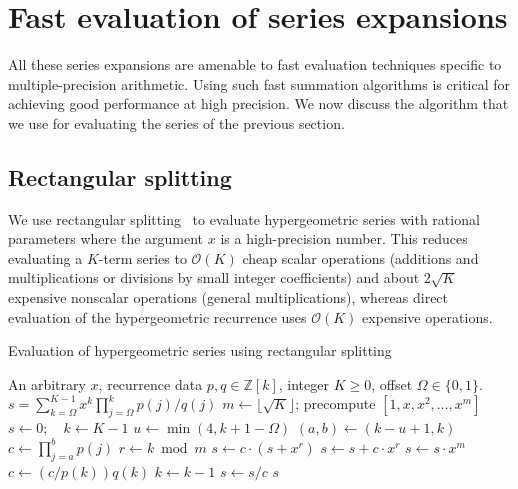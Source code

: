 \documentclass[nohypdvips,review]{siamart0216}
\newcommand{\OO}{\mathcal{O}}
\begin{document}
\section{Fast evaluation of series expansions}

\label{sec:eval}

All these series expansions are amenable to fast evaluation techniques
specific to multiple-precision arithmetic. Using such fast summation
algorithms is critical for achieving good performance at high precision.
We now discuss the algorithm that we use for evaluating the series of
the previous section.

\subsection{Rectangular splitting}

\label{sec:serieseval}

We use rectangular splitting~\cite{Smith1989,Johansson2014rectangular}
to evaluate hypergeometric series with
rational parameters where the argument $x$ is a high-precision number.
This reduces evaluating a $K$-term series to
$\OO(K)$ cheap scalar operations (additions and multiplications or divisions
by small integer coefficients)
and about $2\sqrt{K}$ expensive nonscalar operations (general multiplications),
whereas direct evaluation of the hypergeometric
recurrence uses $\OO(K)$ expensive operations.

\begin{algorithm}[h!]
  \caption{Evaluation of hypergeometric series using rectangular splitting}
  \small
  \label{alg:hyprs}
  \begin{algorithmic}[1]
    \Require An arbitrary $x$, recurrence data $p, q \in \mathbb{Z}[k]$, integer $K \ge 0$, offset $\Omega \in \{0,1\}$.
    \Ensure $s = \sum_{k=\Omega}^{K-1} x^k \prod_{j=\Omega}^k p(j) / q(j)$
    \State $m \gets \lfloor \sqrt K \rfloor$; precompute $[1, x, x^2, \ldots, x^m]$ 
    \State $s \gets 0; \quad k \gets K - 1$
        \State $u \gets \min(4, k + 1 - \Omega)$  
        \State $(a, b) \gets (k - u + 1, k)$  
        \State \label{step:coeff1} $c \gets \prod_{j=a}^b p(j)$ 
            \State $r \gets k \bmod m$
                \State $s \gets c \cdot (s + x^r)$ 
            \Else
                \State $s \gets s + c \cdot x^r$ 
            \EndIf
                \State $s \gets s \cdot x^m$ 
            \EndIf
            \State \label{step:coeff2} $c \gets (c / p(k)) q(k)$ 
            \State $k \gets k - 1$
        \EndWhile
        \State $s \gets s / c$
    \EndWhile
    \State \Return $s$
  \end{algorithmic}
\end{algorithm}
\end{document}
